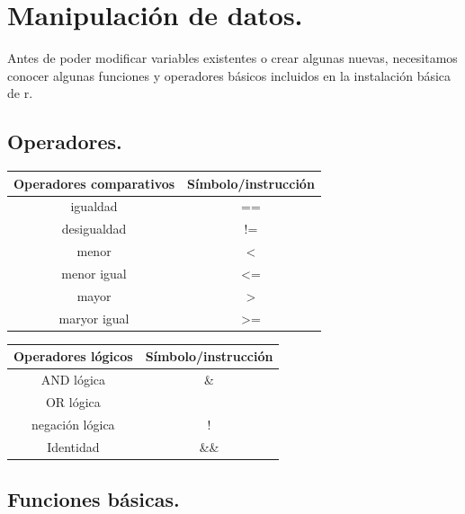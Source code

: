 \documentclass[
  letterpaper,
  DIV=11,
  numbers=noendperiod]{scrreprt}
\begin{document}
\hypertarget{manipulaciuxf3n-de-datos.}{%
\section{Manipulación de datos.}\label{manipulaciuxf3n-de-datos.}}

Antes de poder modificar variables existentes o crear algunas nuevas,
necesitamos conocer algunas funciones y operadores básicos incluidos en
la instalación básica de r.

\hypertarget{operadores.}{%
\subsection{Operadores.}\label{operadores.}}

\begin{longtable}[]{@{}cc@{}}
\toprule()
Operadores comparativos & Símbolo/instrucción \\
\midrule()
\endhead
igualdad & == \\
desigualdad & != \\
menor & \textless{} \\
menor igual & \textless= \\
mayor & \textgreater{} \\
maryor igual & \textgreater= \\
\bottomrule()
\end{longtable}

\begin{longtable}[]{@{}cc@{}}
\toprule()
Operadores lógicos & Símbolo/instrucción \\
\midrule()
\endhead
AND lógica & \& \\
OR lógica & \textbar{} \\
negación lógica & ! \\
Identidad & \&\& \\
\bottomrule()
\end{longtable}

\hypertarget{funciones-buxe1sicas.}{%
\subsection{Funciones básicas.}\label{funciones-buxe1sicas.}}
\end{document}
